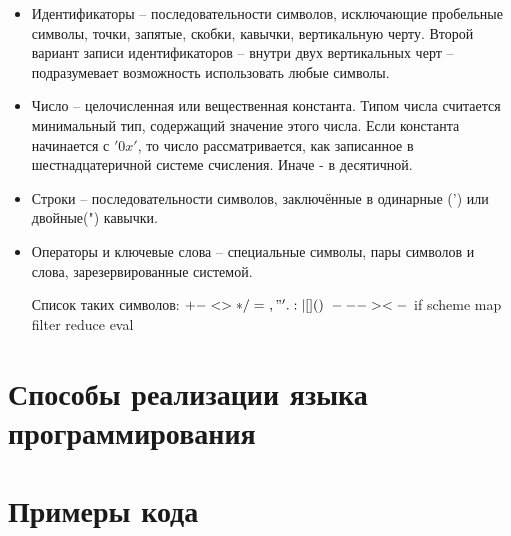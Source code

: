         \begin{itemize}
            \item Идентификаторы -- последовательности символов, исключающие пробельные символы, точки, запятые, скобки, кавычки, вертикальную черту.
            Второй вариант записи идентификаторов -- внутри двух вертикальных черт -- подразумевает возможность использовать любые символы.

            
            \item Число -- целочисленная или вещественная константа. Типом числа считается минимальный тип, содержащий значение этого числа. 
            Если константа начинается с $'0x'$, то число рассматривается, как записанное в шестнадцатеричной системе счисления. 
            Иначе - в десятичной.
            
            
            \item Строки -- последовательности символов, заключённые в одинарные (') или двойные(") кавычки.
                
            \item Операторы и ключевые слова -- специальные символы, пары символов и слова, зарезервированные системой.

            Список таких символов: $ + - < > * / = ~ , " ' . : | [ ] ( ) { } \ -- -> <-$ if scheme map filter reduce eval
        \end{itemize}

\section{Способы реализации языка программирования}
\section{Примеры кода}
    
